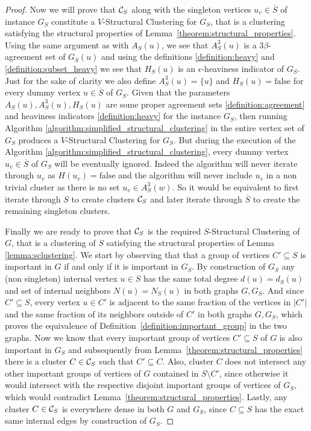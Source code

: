 \documentclass{article}
\begin{document}
\begin{proof}
    Now we will prove that $\mathcal{C}_S$ along with the singleton vertices $u_v\in \overline{S}$ of instance $G_S$ constitute a $V$-Structural Clustering for $G_S$, that is a clustering satisfying the structural properties of Lemma~\ref{theorem:structural_properties}. Using the same argument as with $A_S(u)$, we see that $A_S^3(u)$ is a $3\beta$-agreement set of $G_S(u)$ and using the definitions \ref{definition:heavy} and \ref{definition:subset_heavy} we see that $H_S(u)$ is an $\epsilon$-heaviness indicator of $G_S$. Just for the sake of clarity we also define $A_S^3(u) = \{u\}$ and $H_S(u) = \text{false}$ for every dummy vertex $u\in \overline{S}$ of $G_S$.
Given that the parameters $A_S(u), A_S^3(u), H_S(u)$ are some proper agreement sets \ref{definition:agreement} and heaviness indicators \ref{definition:heavy} for the instance $G_S$, then running Algorithm \ref{algorithm:simplified_structural_clustering} in the entire vertex set of $G_S$ produces a $V$-Structural Clustering for $G_S$. But during the execution of the Algorithm \ref{algorithm:simplified_structural_clustering}, every dummy vertex $u_v\in \overline{S}$ of $G_S$ will be eventually ignored. Indeed the algorithm will never iterate through $u_v$ as $H(u_v) = \text{false}$ and the algorithm will never include $u_v$ in a non trivial cluster as there is no set $u_v\in A_S^3(w)$. So it would be equivalent to first iterate through $S$ to create clusters $\mathcal{C}_S$ and later iterate through $\overline{S}$ to create the remaining singleton clusters.
    
    Finally we are ready to prove that $\mathcal{C}_S$ is the required $S$-Structural Clustering of $G$, that is a clustering of $S$ satisfying the structural properties of Lemma \ref{lemma:sclustering}. We start by observing that that a group of vertices $C'\subseteq S$ is important in $G$ if and only if it is important in $G_S$. By construction of $G_S$ any (non singleton) internal vertex $u\in S$ has the same total degree $d(u) = d_S(u)$ and set of internal neighbors $N(u) = N_S(u)$ in both graphs $G, G_S$. And since $C'\subseteq S$, every vertex $u\in C'$ is adjacent to the same fraction of the vertices in $|C'|$ and the same fraction of its neighbors outside of $C'$ in both graphs $G, G_S$, which proves the equivalence of Definition~\ref{definition:important_group} in the two graphs.
Now we know that every important group of vertices $C'\subseteq S$ of $G$ is also important in $G_S$ and subsequently from Lemma~\ref{theorem:structural_properties} there is a cluster $C\in \mathcal{C}_S$ such that $C'\subseteq C$. Also, cluster $C$ does not intersect any other important groups of vertices of $G$ contained in $S\setminus C'$, since otherwise it would intersect with the respective disjoint important groups of vertices of $G_S$, which would contradict Lemma~\ref{theorem:structural_properties}. Lastly, any cluster $C\in \mathcal{C}_S$ is everywhere dense in both $G$ and $G_S$, since $C\subseteq S$ has the exact same internal edges by construction of $G_S$.
\end{proof}
\end{document}
